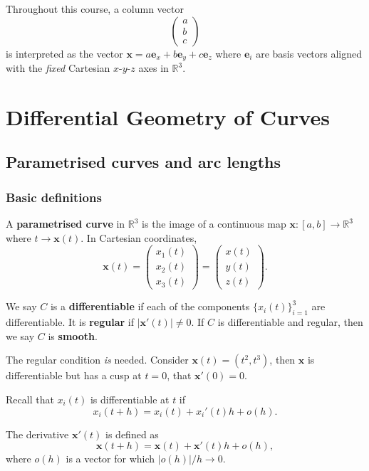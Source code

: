 Throughout this course, a column vector
\[
    \begin{pmatrix}
        a \\ b \\ c
    \end{pmatrix}
\]
is interpreted as the vector $ \mathbf{x} = a \mathbf{e}_x+b \mathbf{e}_y+ c \mathbf{e}_z $ where $ \mathbf{e}_i $ are basis vectors aligned with the \textit{fixed} Cartesian $x$-$y$-$z$ axes in $ \mathbb{R}^{3} $.
\section{Differential Geometry of Curves}
\subsection{Parametrised curves and arc lengths}
\subsubsection*{Basic definitions}
\begin{definition}
    A \textbf{parametrised curve} in $ \mathbb{R}^{3} $ is the image of a continuous map $ \mathbf{x}: [a,b]\to \mathbb{R}^{3} $ where $ t \to \mathbf{x}(t) $. In Cartesian coordinates,
    \[
        \mathbf{x}(t)=\begin{pmatrix}
            x_1(t) \\ x_2(t) \\ x_3(t)
        \end{pmatrix} = \begin{pmatrix}
            x(t) \\ y(t) \\ z(t)
        \end{pmatrix}.
    \]
\end{definition}
\begin{definition}
    We say $C$ is a \textbf{differentiable} if each of the components $ \{x_i(t)\}_{i=1}^3 $ are differentiable. It is \textbf{regular} if $ |\mathbf{x}'(t)|\neq 0 $. If $C$ is differentiable and regular, then we say $C$ is \textbf{smooth}.
\end{definition}
\begin{note}
    The regular condition \textit{is} needed. Consider $ \mathbf{x}(t)=(t^2,t^3) $, then $ \mathbf{x} $ is differentiable but has a cusp at $t=0$, that $ \mathbf{x}'(0)=0 $.
\end{note}
Recall that $x_i(t)$ is differentiable at $t$ if
\[
    x_i(t+h) = x_i(t) + x_i'(t) h+o(h).
\]
\begin{definition}
    The derivative $ \mathbf{x}'(t) $ is defined as
    \[
        \mathbf{x}(t+h) = \mathbf{x}(t) + \mathbf{x}'(t)h + o(h),
    \]
    where $o(h)$ is a vector for which $ |o(h)|/h\to 0 $.
\end{definition}
